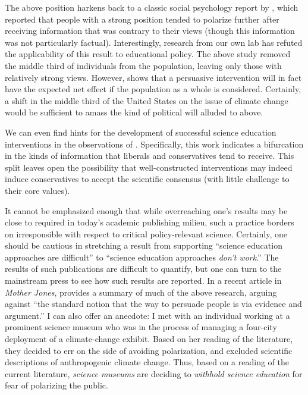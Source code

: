 The above position harkens back to a classic social psychology report by
\textcite{lord_biased_1979}, which reported that people with a strong position
tended to polarize further after receiving information that was contrary to
their views (though this information was  not particularly factual).
Interestingly, research from our own lab has refuted the applicability of this
result to educational policy. The above study removed the middle third of
individuals from the population, leaving only those with relatively strong
views. However, \textcite{nelson_criminal_2007} shows that a persuasive
intervention will in fact have the expected net effect if the population as a
whole is considered. Certainly, a shift in the middle third of the United States
on the issue of climate change would be sufficient to amass the kind of
political will alluded to above.

We can even find hints for the development of successful science education
interventions in the observations of \textcite{mccright_politicization_2011}.
Specifically, this work indicates a bifurcation in the kinds of information that
liberals and conservatives tend to receive.  This split leaves open the
possibility that well-constructed interventions may indeed induce conservatives
to accept the scientific consensus (with little challenge to their core values).  

It cannot be emphasized enough that while overreaching one's results may be
close to required in today's academic publishing milieu, such a practice borders
on irresponsible with respect to critical policy-relevant science. Certainly,
one should be cautious in stretching a result from supporting “science education
approaches are difficult” to “science education approaches \emph{don't work}.”
The results of such publications are difficult to quantify, but one can turn to
the mainstream press to see how such results are reported. In a recent article
in \emph{Mother Jones}, \textcite{mooney_science_2011} provides a summary of
much of the above research, arguing against “the standard notion that the way to
persuade people is via evidence and argument.” I can also offer an anecdote: I
met with an individual working at a prominent science museum who was in the
process of managing a four-city deployment of a climate-change exhibit.  Based on
her reading of the literature, they decided to err on the side of avoiding
polarization, and excluded scientific descriptions of anthropogenic climate
change. Thus, based on a reading of the current literature, \emph{science
    museums} are deciding to \emph{withhold science education} for fear of
polarizing the public.

